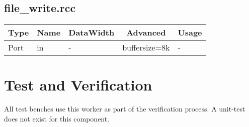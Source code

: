 \documentclass{article}
\def\comp{file\_write}
\begin{document}
\begin{landscape}
	\subsection*{\comp.rcc}
	\begin{scriptsize}
\begin{tabular}{|M{2cm}|M{1.5cm}|M{4cm}|c|M{12cm}|}
\hline
{}
Type & Name & DataWidth & Advanced & Usage
\\
\hline
Port & in & - & buffersize=8k & -\\
\hline
\end{tabular}
	\end{scriptsize}
\end{landscape}

\section*{Test and Verification}
\begin{flushleft}
All test benches use this worker as part of the verification process. A unit-test does not exist for this component.
\end{flushleft}
\end{document}
